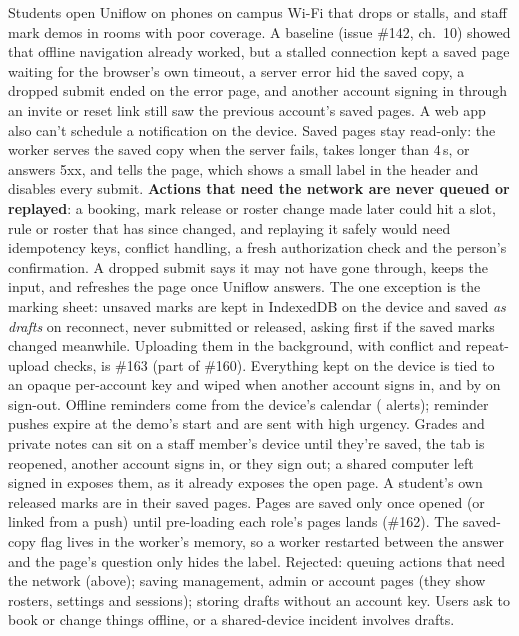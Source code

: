   {Students open Uniflow on phones on campus Wi-Fi that drops or stalls, and staff mark demos in
   rooms with poor coverage. A baseline (issue \#142, ch.~10) showed that offline navigation
   already worked, but a stalled connection kept a saved page waiting for the browser's own
   timeout, a server error hid the saved copy, a dropped submit ended on the error page, and
   another account signing in through an invite or reset link still saw the previous account's
   saved pages. A web app also can't schedule a notification on the device.}
  {Saved pages stay read-only: the worker serves the saved copy when the server fails, takes
   longer than 4\,s, or answers 5xx, and tells the page, which shows a small label in the header
   and disables every submit. \textbf{Actions that need the network are never queued or
   replayed}: a booking, mark release or roster
   change made later could hit a slot, rule or roster that has since changed, and replaying it
   safely would need idempotency keys, conflict handling, a fresh authorization check and the
   person's confirmation. A dropped submit says it may not have gone through, keeps the input,
   and refreshes the page once Uniflow answers. The one exception is the marking sheet: unsaved
   marks are kept in IndexedDB on the device and saved \emph{as drafts} on reconnect, never
   submitted or released, asking first if the saved marks changed meanwhile. Uploading them in
   the background, with conflict and repeat-upload checks, is \#163 (part of \#160). Everything kept on the device is
   tied to an opaque per-account key and wiped when another account signs in, and by
    on sign-out. Offline reminders come from the device's calendar
   ( alerts); reminder pushes expire at the demo's start and are sent with high
   urgency.}
  {Grades and private notes can sit on a staff member's device until they're saved, the tab is
   reopened, another account signs in, or they sign out; a shared computer left signed in
   exposes them, as it already exposes the open page. A student's own released marks are in
   their saved pages. Pages are saved only once opened (or linked from a push) until
   pre-loading each role's pages lands (\#162). The saved-copy flag lives in the worker's
   memory, so a worker restarted between the answer and the page's question only hides the
   label. Rejected: queuing actions that need the network (above); saving management, admin
   or account pages (they show rosters, settings and sessions); storing drafts without an
   account key.}
  {Users ask to book or change things offline, or a shared-device incident involves drafts.}

